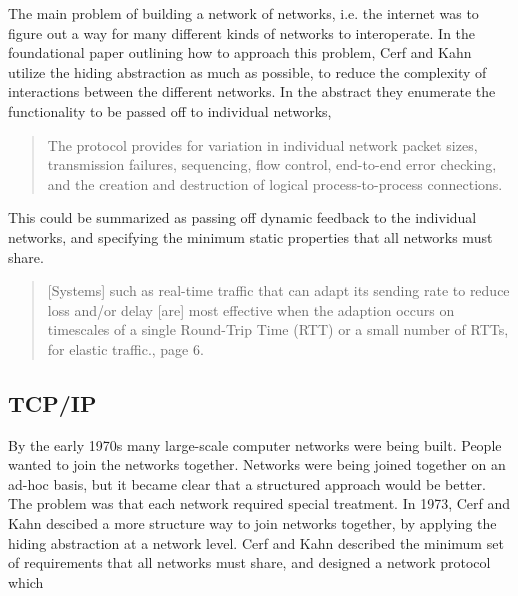 

The main problem of building a network of networks, i.e. the internet was to figure out a way for
many different kinds of networks to interoperate. In the foundational paper outlining how to
approach this problem\cite{cerf1974}, Cerf and Kahn utilize the hiding abstraction as much as
possible, to reduce the complexity of interactions between the different networks. In the abstract
they enumerate the functionality to be passed off to individual networks, 

\begin{quote}
The protocol provides for variation in individual network packet sizes, transmission failures,
sequencing, flow control, end-to-end error checking, and the creation and destruction of logical
process-to-process connections.
\end{quote}

This could be summarized as passing off dynamic feedback to the individual networks, and specifying
the minimum static properties that all networks must share. 


\begin{quote}
    [Systems] such as real-time traffic that can adapt its sending rate to reduce loss and/or delay
    [are] most effective when the adaption occurs on timescales of a single Round-Trip Time (RTT) or
    a small number of RTTs, for elastic traffic.\cite{rfc7567}, page 6.
\end{quote}

\subsection{TCP/IP}



By the early 1970s many large-scale computer networks were being built. People wanted to join the
networks together. Networks were being joined together on an ad-hoc basis, but it became clear that
a structured approach would be better. The problem was that each network required special treatment.
In 1973, Cerf and Kahn \cite{cerf1974} descibed a more structure way to join networks together, by
applying the hiding abstraction at a network level. Cerf and Kahn described the minimum set of
requirements that all networks must share, and designed a network protocol which   

